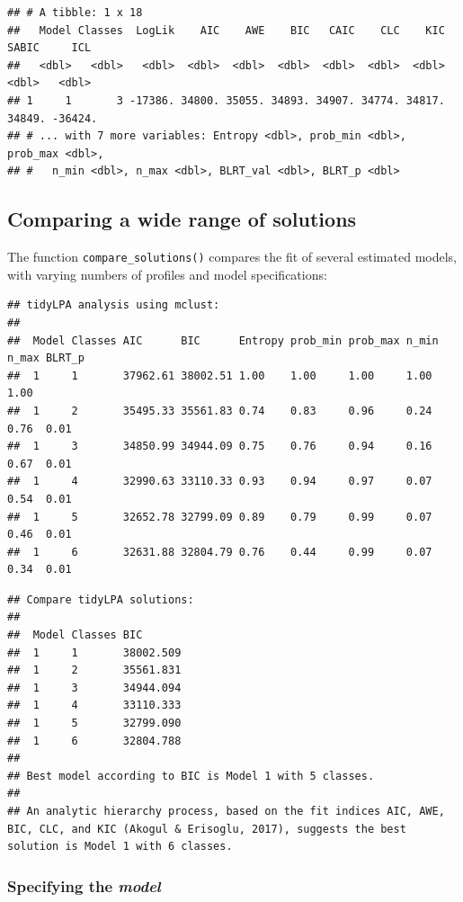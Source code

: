 \documentclass[man]{apa6}
\begin{document}
\begin{verbatim}
## # A tibble: 1 x 18
##   Model Classes  LogLik    AIC    AWE    BIC   CAIC    CLC    KIC  SABIC     ICL
##   <dbl>   <dbl>   <dbl>  <dbl>  <dbl>  <dbl>  <dbl>  <dbl>  <dbl>  <dbl>   <dbl>
## 1     1       3 -17386. 34800. 35055. 34893. 34907. 34774. 34817. 34849. -36424.
## # ... with 7 more variables: Entropy <dbl>, prob_min <dbl>, prob_max <dbl>,
## #   n_min <dbl>, n_max <dbl>, BLRT_val <dbl>, BLRT_p <dbl>
\end{verbatim}

\hypertarget{comparing-a-wide-range-of-solutions}{%
\subsection{Comparing a wide range of solutions}\label{comparing-a-wide-range-of-solutions}}

The function \texttt{compare\_solutions()} compares the fit of several estimated models,
with varying numbers of profiles and model specifications:

\begin{verbatim}
## tidyLPA analysis using mclust: 
## 
##  Model Classes AIC      BIC      Entropy prob_min prob_max n_min n_max BLRT_p
##  1     1       37962.61 38002.51 1.00    1.00     1.00     1.00  1.00        
##  1     2       35495.33 35561.83 0.74    0.83     0.96     0.24  0.76  0.01  
##  1     3       34850.99 34944.09 0.75    0.76     0.94     0.16  0.67  0.01  
##  1     4       32990.63 33110.33 0.93    0.94     0.97     0.07  0.54  0.01  
##  1     5       32652.78 32799.09 0.89    0.79     0.99     0.07  0.46  0.01  
##  1     6       32631.88 32804.79 0.76    0.44     0.99     0.07  0.34  0.01
\end{verbatim}

\begin{verbatim}
## Compare tidyLPA solutions:
## 
##  Model Classes BIC      
##  1     1       38002.509
##  1     2       35561.831
##  1     3       34944.094
##  1     4       33110.333
##  1     5       32799.090
##  1     6       32804.788
## 
## Best model according to BIC is Model 1 with 5 classes.
## 
## An analytic hierarchy process, based on the fit indices AIC, AWE, BIC, CLC, and KIC (Akogul & Erisoglu, 2017), suggests the best solution is Model 1 with 6 classes.
\end{verbatim}

\hypertarget{specifying-the-model}{%
\subsubsection{\texorpdfstring{Specifying the \emph{model}}{Specifying the model}}\label{specifying-the-model}}
\end{document}
